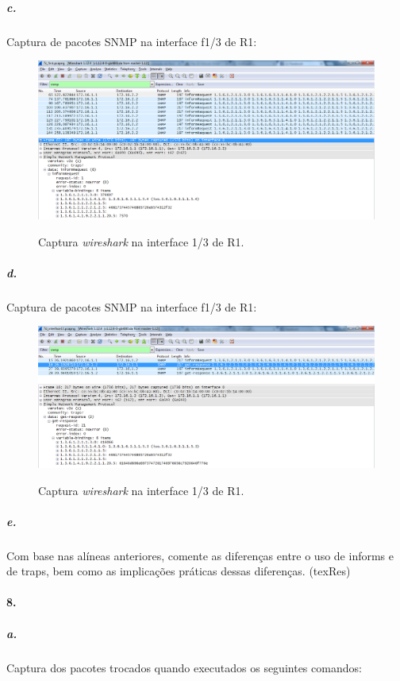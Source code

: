 \subparagraph{c.}
Captura de pacotes SNMP na interface \textsf{f1/3} de \textsf{R1}:

\begin{figure}[h]
\centering
\includegraphics[width=1\textwidth, height=0.33\textheight]{7c.png}
\label{fig:12-capturaWireshark}
\caption{Captura \emph{wireshark} na interface \textsf{1/3} de \textsf{R1}.}
\end{figure}


\subparagraph{d.}
Captura de pacotes SNMP na interface \textsf{f1/3} de \textsf{R1}:

\begin{figure}[h]
\centering
\includegraphics[width=1\textwidth, height=0.33\textheight]{7d.png}
\label{fig:13-capturaWireshark}
\caption{Captura \emph{wireshark} na interface \textsf{1/3} de \textsf{R1}.}
\end{figure}


\subparagraph{e.}
Com base nas alíneas anteriores, comente as diferenças entre o uso de informs e de traps, bem como as implicações práticas dessas diferenças. (texRes)


\paragraph{8.}

\subparagraph{a.}
Captura dos pacotes trocados quando executados os seguintes comandos:

